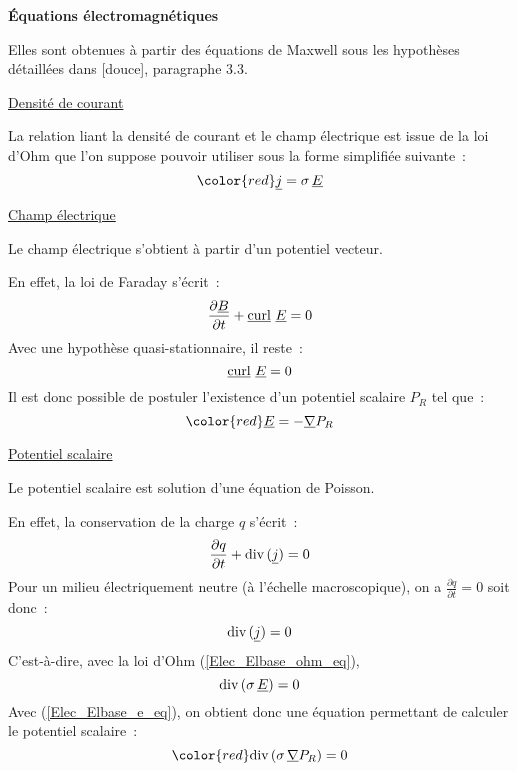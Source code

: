 \vspace*{0,5cm}
{\bf Équations électromagnétiques}
\nopagebreak

Elles sont obtenues à partir des
équations de Maxwell sous les hypothèses détaillées dans [douce],
paragraphe 3.3.

\underline{Densité de courant}
\nopagebreak

La relation liant la densité de courant et le champ électrique est issue de
la loi d'Ohm que l'on suppose pouvoir utiliser sous la forme
simplifiée suivante~:
\begin{equation}\label{Elec_Elbase_ohm_eq}
{\color{red}\vect{j}=\sigma\,\vect{E}}
\end{equation}

\underline{Champ électrique}
\nopagebreak

Le champ électrique s'obtient à partir d'un potentiel vecteur.

En effet, la loi de Faraday s'écrit~:
\begin{equation}
\frac{\partial\underline{B}}{\partial t}+\underline{\text{curl}}\ \underline{E}=0
\end{equation}
Avec une hypothèse quasi-stationnaire, il reste~:
\begin{equation}
\underline{\text{curl}}\ \underline{E}=0
\end{equation}
Il est donc possible de postuler l'existence d'un potentiel scalaire $P_R$
tel que~:
\begin{equation}\label{Elec_Elbase_e_eq}
{\color{red}\vect{E}=-\grad{P_R}}
\end{equation}

\underline{Potentiel scalaire}
\nopagebreak

Le potentiel scalaire est solution d'une équation de Poisson.

En effet, la conservation de la charge $q$ s'écrit~:
\begin{equation}
\displaystyle\frac{\partial q}{\partial t}
+\text{div}\,(\underline{j}) = 0
\end{equation}
Pour un milieu électriquement neutre (à l'échelle macroscopique), on a
$\displaystyle\frac{\partial q}{\partial t}=0$ soit donc~:
\begin{equation}
\text{div}\,(\underline{j}) = 0
\end{equation}
C'est-à-dire, avec la loi d'Ohm (\ref{Elec_Elbase_ohm_eq}),
\begin{equation} \label{Elec_Elbase_div_sigma_e_eq}
\text{div}\,(\sigma\,\underline{E}) = 0
\end{equation}
Avec (\ref{Elec_Elbase_e_eq}), on obtient donc une équation permettant de
calculer le potentiel scalaire~:
\begin{equation}
{\color{red}\dive(\sigma\,\grad{P_R}) = 0}
\end{equation}

